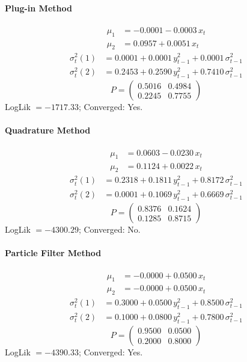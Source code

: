 \documentclass[11pt, a4paper]{article}
\begin{document}
\paragraph{Plug-in Method}
\begin{align}
\mu_{1} &= -0.0001 -0.0003\, x_t \\
\mu_{2} &= 0.0957 + 0.0051\, x_t
\end{align}
\begin{align}
\sigma^2_{t}(1) &= 0.0001 + 0.0001\, y_{t-1}^2 + 0.0001\, \sigma^2_{t-1} \\
\sigma^2_{t}(2) &= 0.2453 + 0.2590\, y_{t-1}^2 + 0.7410\, \sigma^2_{t-1}
\end{align}
\begin{equation}
P = \begin{pmatrix} 0.5016 & 0.4984 \\ 0.2245 & 0.7755 \end{pmatrix}
\end{equation}
LogLik $= -1717.33$; Converged: Yes.

\paragraph{Quadrature Method}
\begin{align}
\mu_{1} &= 0.0603 -0.0230\, x_t \\
\mu_{2} &= 0.1124 + 0.0022\, x_t
\end{align}
\begin{align}
\sigma^2_{t}(1) &= 0.2318 + 0.1811\, y_{t-1}^2 + 0.8172\, \sigma^2_{t-1} \\
\sigma^2_{t}(2) &= 0.0001 + 0.1069\, y_{t-1}^2 + 0.6669\, \sigma^2_{t-1}
\end{align}
\begin{equation}
P = \begin{pmatrix} 0.8376 & 0.1624 \\ 0.1285 & 0.8715 \end{pmatrix}
\end{equation}
LogLik $= -4300.29$; Converged: No.

\paragraph{Particle Filter Method}
\begin{align}
\mu_{1} &= -0.0000 + 0.0500\, x_t \\
\mu_{2} &= -0.0000 + 0.0500\, x_t
\end{align}
\begin{align}
\sigma^2_{t}(1) &= 0.3000 + 0.0500\, y_{t-1}^2 + 0.8500\, \sigma^2_{t-1} \\
\sigma^2_{t}(2) &= 0.1000 + 0.0800\, y_{t-1}^2 + 0.7800\, \sigma^2_{t-1}
\end{align}
\begin{equation}
P = \begin{pmatrix} 0.9500 & 0.0500 \\ 0.2000 & 0.8000 \end{pmatrix}
\end{equation}
LogLik $= -4390.33$; Converged: Yes.
\end{document}
